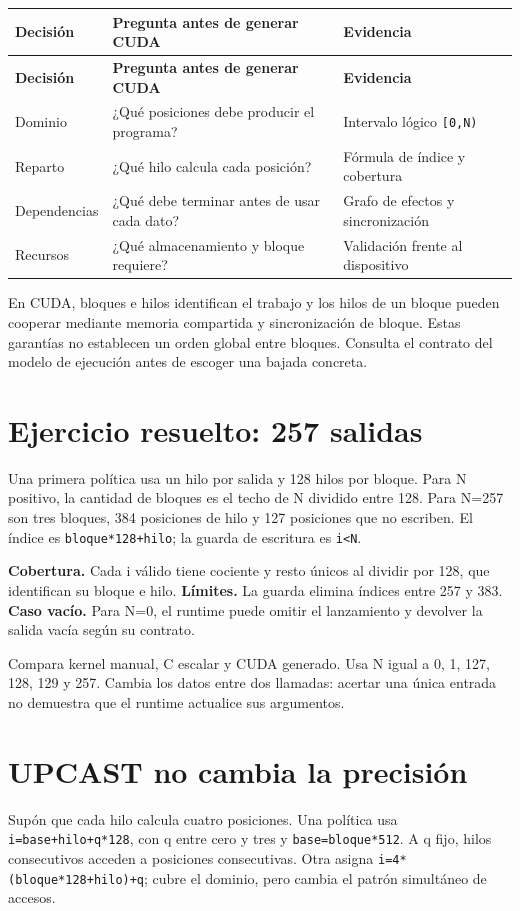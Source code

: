 \documentclass[12pt,a4paper,oneside]{report}
\begin{document}
{\small
\begin{longtable}{@{}P{0.28\textwidth}P{0.32\textwidth}P{0.34\textwidth}@{}}
\toprule
\textbf{Decisión} & \textbf{Pregunta antes de generar CUDA} & \textbf{Evidencia}\\
\midrule
\endfirsthead
\toprule
\textbf{Decisión} & \textbf{Pregunta antes de generar CUDA} & \textbf{Evidencia}\\
\midrule
\endhead
Dominio & ¿Qué posiciones debe producir el programa? & Intervalo lógico \texttt{[0,N)}\\
Reparto & ¿Qué hilo calcula cada posición? & Fórmula de índice y cobertura\\
Dependencias & ¿Qué debe terminar antes de usar cada dato? & Grafo de efectos y sincronización\\
Recursos & ¿Qué almacenamiento y bloque requiere? & Validación frente al dispositivo\\
\bottomrule
\end{longtable}
}
En CUDA, bloques e hilos identifican el trabajo y los hilos de un bloque pueden cooperar mediante memoria compartida y sincronización de bloque. Estas garantías no establecen un orden global entre bloques. Consulta el contrato del modelo de ejecución antes de escoger una bajada concreta. \cite{cuda-guide}

\section{Ejercicio resuelto: 257 salidas}
Una primera política usa un hilo por salida y 128 hilos por bloque. Para N positivo, la cantidad de bloques es el techo de N dividido entre 128. Para N=257 son tres bloques, 384 posiciones de hilo y 127 posiciones que no escriben. El índice es \texttt{bloque*128+hilo}; la guarda de escritura es \texttt{i<N}.

\textbf{Cobertura.} Cada i válido tiene cociente y resto únicos al dividir por 128, que identifican su bloque e hilo. \textbf{Límites.} La guarda elimina índices entre 257 y 383. \textbf{Caso vacío.} Para N=0, el runtime puede omitir el lanzamiento y devolver la salida vacía según su contrato.

Compara kernel manual, C escalar y CUDA generado. Usa N igual a 0, 1, 127, 128, 129 y 257. Cambia los datos entre dos llamadas: acertar una única entrada no demuestra que el runtime actualice sus argumentos.

\section{UPCAST no cambia la precisión}
Supón que cada hilo calcula cuatro posiciones. Una política usa \texttt{i=base+hilo+q*128}, con q entre cero y tres y \texttt{base=bloque*512}. A q fijo, hilos consecutivos acceden a posiciones consecutivas. Otra asigna \texttt{i=4*(bloque*\allowbreak{}128+hilo)+q}; cubre el dominio, pero cambia el patrón simultáneo de accesos.
\end{document}
